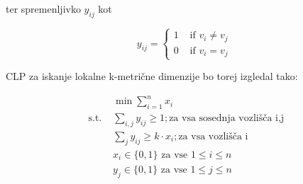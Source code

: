 \documentclass[a4paper,12pt]{article}
\begin{document}
    ter spremenljivko $y_{ij}$ kot

    $$
    y_{ij}= \begin{cases}1 & \text { if } v_{i} \neq v_{j}  \\ 0 & \text { if } v_{i} = v_{j}\end{cases}
    $$

    CLP za iskanje lokalne k-metrične dimenzije bo torej izgledal tako:

    $$
    \begin{array}{ll} 
    & \min \sum_{i=1}^{n} x_{i} \\
    \text { s.t. } & \sum_{i,j} y_{ij} \geq 1; \text {za vsa sosednja vozlišča i,j}\\
    & \sum_{j} y_{ij} \geq k \cdot x_{i}; \text {za vsa vozlišča i}\\
    & x_{i} \in\{0,1\} \text { za vse } 1 \leq i \leq n \\
    & y_{j} \in\{0,1\} \text { za vse } 1 \leq j \leq n
    \end{array}
$$
\end{document}

